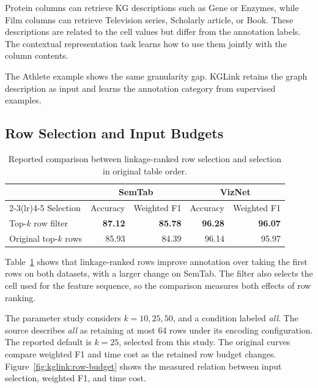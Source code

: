 Protein columns can retrieve KG descriptions such as Gene or Enzymes, while Film columns can retrieve Television series, Scholarly article, or Book. These descriptions are related to the cell values but differ from the annotation labels. The contextual representation task learns how to use them jointly with the column contents.

The Athlete example shows the same granularity gap. KGLink retains the graph description as input and learns the annotation category from supervised examples.

\subsection{Row Selection and Input Budgets}
\label{sec:kglink:row-evaluation}

\begin{table}[tbp]
\centering
\caption{Reported comparison between linkage-ranked row selection and selection in original table order.}
\label{tab:kglink:row-filter}
\begin{tabular}{lrrrr}
\toprule
&\multicolumn{2}{c}{SemTab}&\multicolumn{2}{c}{VizNet}\\
\cmidrule(lr){2-3}\cmidrule(lr){4-5}
Selection&Accuracy&Weighted F1&Accuracy&Weighted F1\\
\midrule
Top-$k$ row filter&\textbf{87.12}&\textbf{85.78}&\textbf{96.28}&\textbf{96.07}\\
Original top-$k$ rows&85.93&84.39&96.14&95.97\\
\bottomrule
\end{tabular}
\end{table}

Table~\ref{tab:kglink:row-filter} shows that linkage-ranked rows improve annotation over taking the first rows on both datasets, with a larger change on SemTab. The filter also selects the cell used for the feature sequence, so the comparison measures both effects of row ranking.

The parameter study considers $k=10,25,50$, and a condition labeled \emph{all}. The source describes \emph{all} as retaining at most 64 rows under its encoding configuration. The reported default is $k=25$, selected from this study. The original curves compare weighted F1 and time cost as the retained row budget changes. Figure~\ref{fig:kglink:row-budget} shows the measured relation between input selection, weighted F1, and time cost.

